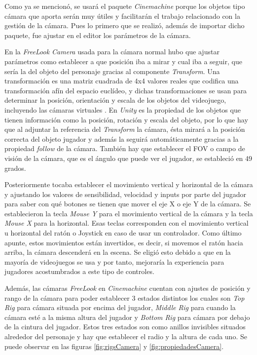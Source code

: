 Como ya se mencionó, se usará el paquete \textit{Cinemachine} porque los objetos tipo cámara que aporta serán muy útiles y facilitarán el trabajo relacionado con la gestión de la cámara. Pues lo primero que se realizó, además de importar dicho paquete, fue ajustar en el editor los parámetros de la cámara. 

En la \textit{FreeLook Camera} usada para la cámara normal hubo que ajustar parámetros como establecer a que posición iba a mirar y cual iba a seguir, que sería la del objeto del personaje gracias al componente \textit{Transform}. Una transformación es una matriz cuadrada de 4x4 valores reales que codifica una transformación afín del espacio euclídeo, y dichas transformaciones se usan para determinar la posición, orientación y escala de los objetos del videojuego, incluyendo las cámaras virtuales \cite{Foundations3d}. En \textit{Unity} es la propiedad de los objetos que tienen información como la posición, rotación y escala del objeto, por lo que hay que al adjuntar la referencia del \textit{Transform} la cámara, ésta mirará a la posición correcta del objeto jugador y además la seguirá automáticamente gracias a la propiedad \textit{follow} de la cámara. También hay que establecer el FOV o campo de visión de la cámara, que es el ángulo que puede ver el jugador, se estableció en 49 grados.

Posteriormente tocaba establecer el movimiento vertical y horizontal de la cámara y ajustando los valores de sensibilidad, velocidad y inputs por parte del jugador para saber con qué botones se tienen que mover el eje X o eje Y de la cámara. Se establecieron la tecla \textit{Mouse Y} para el movimiento vertical de la cámara y la tecla \textit{Mouse X} para la horizontal. Esas teclas corresponden con el movimiento vertical u horizontal del ratón o Joystick en caso de usar un controlador. Como último apunte, estos movimientos están invertidos, es decir, si movemos el ratón hacia arriba, la cámara descenderá en la escena. Se eligió esto debido a que en la mayoría de videojuegos se usa y por tanto, mejoraría la experiencia para jugadores acostumbrados a este tipo de controles.

Además, las cámaras \textit{FreeLook} en \textit{Cinemachine} cuentan con ajustes de posición y rango de la cámara para poder establecer 3 estados distintos los cuales son \textit{Top Rig} para cámara situada por encima del jugador, \textit{Middle Rig} para cuando la cámara esté a la misma altura del jugador y \textit{Bottom Rig} para cámara por debajo de la cintura del jugador. Estos tres estados son como anillos invisibles situados alrededor del personaje y hay que establecer el radio y la altura de cada uno. Se puede observar en las figuras \ref{fig:rigsCamera} y \ref{fig:propiedadesCamera}.


